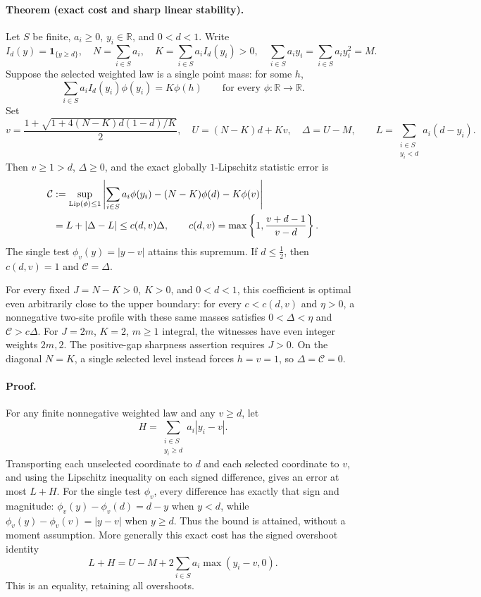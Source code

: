 \paragraph{Theorem (exact cost and sharp linear stability).}
Let \(S\) be finite, \(a_i\geq0\), \(y_i\in\mathbb R\), and \(0<d<1\).
Write
\[
 I_d(y)=\mathbf1_{\{y\geq d\}},\quad
 N=\sum_{i\in S}a_i,\quad
 K=\sum_{i\in S}a_iI_d(y_i)>0,\quad
 \sum_{i\in S}a_i y_i=\sum_{i\in S}a_i y_i^2=M.
\]
Suppose the selected weighted law is a single point mass: for some \(h\),
\[
 \sum_{i\in S}a_iI_d(y_i)\phi(y_i)=K\phi(h)
 \qquad\text{for every }\phi:\mathbb R\longrightarrow\mathbb R.
\]
Set
\[
 v=\frac{1+\sqrt{1+4(N-K)d(1-d)/K}}2,\quad
 U=(N-K)d+Kv,\quad \Delta=U-M,
 \qquad L=\sum_{\substack{i\in S\\y_i<d}}a_i(d-y_i).
\]
Then \(v\geq1>d\), \(\Delta\geq0\), and the exact globally
\(1\)-Lipschitz statistic error is
\begin{align}
 \mathcal C&:=
 \sup_{\operatorname{Lip}(\phi)\leq1}
 \left|\sum_{i\in S}a_i\phi(y_i)-(N-K)\phi(d)-K\phi(v)\right| \notag\\
 &=L+|\Delta-L|
 \leq c(d,v)\Delta,\qquad
 c(d,v)=\max\left\{1,\frac{v+d-1}{v-d}\right\}.
 \label{eq:single-selected-linear}
\end{align}
The single test \(\phi_v(y)=|y-v|\) attains this supremum.
If \(d\leq\tfrac12\), then \(c(d,v)=1\) and
\(\mathcal C=\Delta\).

For every fixed \(J=N-K>0\), \(K>0\), and \(0<d<1\), this coefficient
is optimal even arbitrarily close to the upper boundary: for every
\(c<c(d,v)\) and \(\eta>0\), a nonnegative two-site profile with these
same masses satisfies \(0<\Delta<\eta\) and
\(\mathcal C>c\Delta\).  For \(J=2m\), \(K=2\), \(m\geq1\) integral,
the witnesses have even integer weights \(2m,2\).
The positive-gap sharpness assertion requires \(J>0\).
On the diagonal \(N=K\), a single selected level instead forces
\(h=v=1\), so \(\Delta=\mathcal C=0\).

\paragraph{Proof.}
For any finite nonnegative weighted law and any \(v\geq d\), let
\[
 H=\sum_{\substack{i\in S\\y_i\geq d}}a_i|y_i-v|.
\]
Transporting each unselected coordinate to \(d\) and each selected
coordinate to \(v\), and using the Lipschitz inequality on each signed
difference, gives an error at most \(L+H\).  For the single test
\(\phi_v\), every difference has exactly that sign and magnitude:
\(\phi_v(y)-\phi_v(d)=d-y\) when \(y<d\), while
\(\phi_v(y)-\phi_v(v)=|y-v|\) when \(y\geq d\).
Thus the bound is attained, without a moment assumption.
More generally this exact cost has the signed overshoot identity
\[
 L+H=U-M+
       2\sum_{i\in S}a_i\max(y_i-v,0).
\]
This is an equality, retaining all overshoots.

